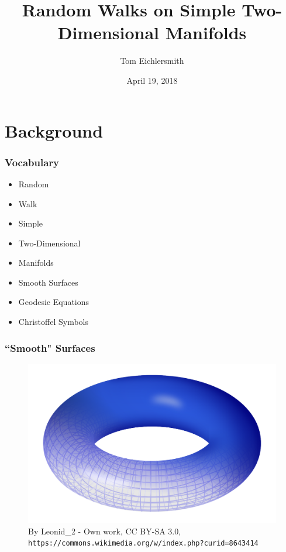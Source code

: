 \documentclass{beamer}
\title[Random Walks]{Random Walks on Simple Two-Dimensional Manifolds} %
\author{Tom Eichlersmith}
\institute[Hamline U]
{
Hamline University \\
\medskip
\texttt{teichlersmith01@hamline.edu}
}
\date{April 19, 2018}
\begin{document}
\begin{frame}
	\titlepage %
\end{frame}


\section{Background} 

\begin{frame}

	\frametitle{Vocabulary}
	
	\begin{itemize}
		\item Random
		\item Walk
		\item Simple
		\item Two-Dimensional
		\item Manifolds
		\item Smooth Surfaces
		\item Geodesic Equations
		\item Christoffel Symbols
	\end{itemize}

\end{frame}


\begin{frame}

	\frametitle{``Smooth" Surfaces}
	
	\begin{figure}
		\includegraphics[width=\textwidth]{images/Torus.png}
		\caption{By Leonid\_2 - Own work, CC BY-SA 3.0, \texttt{https://commons.wikimedia.org/w/index.php?curid=8643414}}
	\end{figure}
	
\end{frame}
\end{document}
